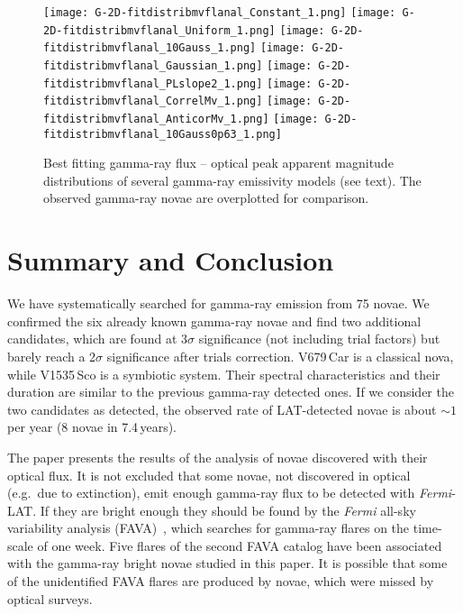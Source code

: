 \documentclass{aa} %
\newcommand{\Fermi}{\textit{Fermi}}
\begin{document}
\begin{figure*}[!t]
\begin{center}
\texttt{[image: G-2D-fitdistribmvflanal\_Constant\_1.png]}
\texttt{[image: G-2D-fitdistribmvflanal\_Uniform\_1.png]}
\texttt{[image: G-2D-fitdistribmvflanal\_10Gauss\_1.png]}
\texttt{[image: G-2D-fitdistribmvflanal\_Gaussian\_1.png]}
\texttt{[image: G-2D-fitdistribmvflanal\_PLslope2\_1.png]}
\texttt{[image: G-2D-fitdistribmvflanal\_CorrelMv\_1.png]}
\texttt{[image: G-2D-fitdistribmvflanal\_AnticorMv\_1.png]}
\texttt{[image: G-2D-fitdistribmvflanal\_10Gauss0p63\_1.png]}
\caption{Best fitting gamma-ray flux -- optical peak apparent magnitude distributions of several gamma-ray emissivity models (see text). The observed gamma-ray novae are overplotted for comparison.
\label{fig:2ddistrib}}
\end{center}
\end{figure*}



\section{Summary and Conclusion}
\label{sec:conclusion}
We have systematically searched for gamma-ray emission from 75 novae. We confirmed the six already known gamma-ray novae and find two additional candidates, which are found at $3\sigma$ significance (not including trial factors) but barely reach a 2$\sigma$ significance after trials correction. V679\,Car is a classical nova, while V1535\,Sco is a symbiotic system. Their spectral characteristics and their duration are similar to the previous gamma-ray detected ones. If we consider the two candidates as detected, the observed rate of LAT-detected novae is about $\sim1$ per year (8 novae in 7.4\,years). 

The paper presents the results of the analysis of novae discovered with their optical flux. It is not excluded that some novae, not discovered in optical (e.g.~due to extinction), emit enough gamma-ray flux to be detected with \Fermi-LAT. If they are bright enough they should be found by the \textit{Fermi} all-sky variability analysis (FAVA)~\citep{2016arXiv161203165A}, which searches for gamma-ray flares on the time-scale of one week. Five flares of the second FAVA catalog have been associated with the gamma-ray bright novae studied in this paper. It is possible that some of the unidentified FAVA flares are produced by novae, which were missed by optical surveys.
\end{document}
